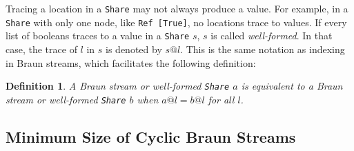 \documentclass[envcountsect]{llncs}
\newcommand{\share}{{\tt Share} }
\newtheorem{definition}{Definition}
\begin{document}
Tracing a location in a \share may not always produce a value.
For example, in a {\tt Share} with only one node, like {\tt Ref [True]}, no locations trace to values.
If every list of booleans traces to a value in a \share $s$, $s$ is called {\em well-formed}.
In that case, the trace of $l$ in $s$ is denoted by $s@l$.
This is the same notation as indexing in Braun streams, which facilitates the following definition:

\begin{definition}
A Braun stream or well-formed \share $a$ is {\em equivalent} to a Braun stream or well-formed \share $b$ when $a@l = b@l$ for all $l$.
\end{definition}

\subsection{Minimum Size of Cyclic Braun Streams}
\end{document}
